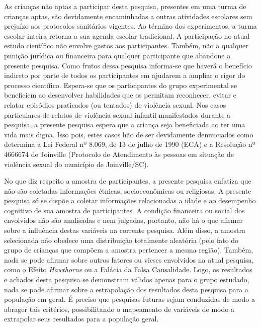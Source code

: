 As crianças não aptas a participar desta pesquisa, presentes em uma turma de crianças aptas, são devidamente encaminhadas a outras atividades escolares sem prejuízo aos protocolos sanitários vigentes. %
Ao término dos experimentos, a turma escolar inteira retorna a sua agenda escolar tradicional. A participação no atual estudo científico não envolve gastos aos participantes. Também, não a qualquer punição jurídica ou financeira para qualquer participante que abandone a presente pesquisa. Como frutos dessa pesquisa informa-se que haverá o benefício indireto por parte de todos os participantes em ajudarem a ampliar o rigor do processo científico. Espera-se que os participantes do grupo experimental se beneficiem ao desenvolver habilidades que os permitam reconhecer, evitar e relatar episódios praticados (ou tentados) de violência sexual. Nos casos particulares de relatos de violência sexual infantil manifestados durante a pesquisa, a presente pesquisa espera que a criança seja beneficiada ao ter uma vida mais digna. Isso pois, estes casos hão de ser devidamente denunciados como determina a Lei Federal nº 8.069, de 13 de julho de 1990 (\ac{ECA}) e a Resolução nº 4666674 de Joinville (Protocolo de Atendimento às pessoas em situação de violência sexual do município de Joinville/SC). 

No que diz respeito a amostra de participantes, a presente pesquisa enfatiza que não são coletadas informações étnicas, socioeconômicas ou religiosas. A presente pesquisa só se dispõe a coletar informações relacionadas a idade e ao desempenho cognitivo de sua amostra de participantes. A condição financeira ou social dos envolvidos não são analisadas e nem julgadas, portanto, não há o que afirmar sobre a influência destas variáveis na corrente pesquisa. Além disso, a amostra selecionada não obedece uma distribuição totalmente aleatória (pelo fato do grupo de crianças que compõem a amostra pertencer a mesma região). Também, nada se pode afirmar sobre outros fatores ou vieses envolvidos na atual pesquisa, como o Efeito \textit{Hawthorne} ou a Falácia da Falsa Causalidade. Logo, os resultados e achados desta pesquisa se demonstram válidos apenas para o grupo estudado, nada se pode afirmar sobre a estrapolação dos resultados desta pesquisa para a população em geral. É preciso que pesquisas futuras sejam conduzidas de modo a abrager tais critérios, possibilitando o mapeamento de variáveis de modo a extrapolar seus resultados para a população geral. 

